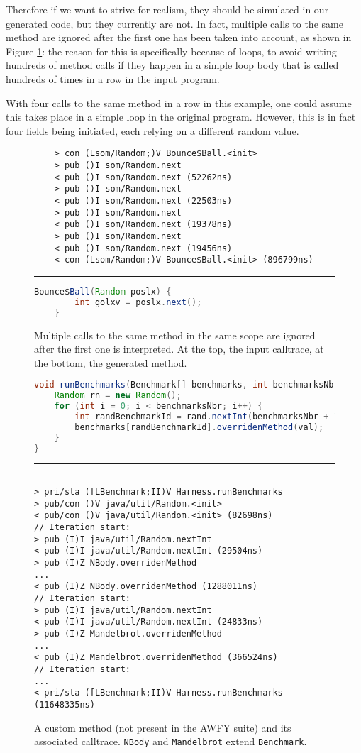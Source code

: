 \documentclass[12pt]{article}
\begin{document}
Therefore if we want to strive for realism, they should be simulated in our generated code, but they currently are not. In fact, multiple calls to the same method are ignored after the first one has been taken into account, as shown in Figure \ref{fig:multiplecalls}: the reason for this is specifically because of loops, to avoid writing hundreds of method calls if they happen in a simple loop body that is called hundreds of times in a row in the input program.

With four calls to the same method in a row in this example, one could assume this takes place in a simple loop in the original program. However, this is in fact four fields being initiated, each relying on a different random value.

\begin{figure}[h!]
\begin{verbatim}
	> con (Lsom/Random;)V Bounce$Ball.<init>
	> pub ()I som/Random.next
	< pub ()I som/Random.next (52262ns)
	> pub ()I som/Random.next
	< pub ()I som/Random.next (22503ns)
	> pub ()I som/Random.next
	< pub ()I som/Random.next (19378ns)
	> pub ()I som/Random.next
	< pub ()I som/Random.next (19456ns)
	< con (Lsom/Random;)V Bounce$Ball.<init> (896799ns)
\end{verbatim}
\hrule
\begin{lstlisting}[language=java]
	Bounce$Ball(Random poslx) {
		int golxv = poslx.next();
	}
\end{lstlisting}
\captionsetup{justification=centering}
\caption{Multiple calls to the same method in the same scope are ignored after the first one is interpreted. At the top, the input calltrace, at the bottom, the generated method.}
\label{fig:multiplecalls}
\end{figure}

\begin{figure}[h!]
\begin{lstlisting}[language=java]
void runBenchmarks(Benchmark[] benchmarks, int benchmarksNbr, int val) {
	Random rn = new Random();
	for (int i = 0; i < benchmarksNbr; i++) {
		int randBenchmarkId = rand.nextInt(benchmarksNbr + 1);
		benchmarks[randBenchmarkId].overridenMethod(val);
	}
}
\end{lstlisting}
\hrule
\smallskip
\begin{verbatim}
	
> pri/sta ([LBenchmark;II)V Harness.runBenchmarks
> pub/con ()V java/util/Random.<init>
< pub/con ()V java/util/Random.<init> (82698ns)
// Iteration start:
> pub (I)I java/util/Random.nextInt
< pub (I)I java/util/Random.nextInt (29504ns)
> pub (I)Z NBody.overridenMethod
...
< pub (I)Z NBody.overridenMethod (1288011ns)
// Iteration start:
> pub (I)I java/util/Random.nextInt
< pub (I)I java/util/Random.nextInt (24833ns)
> pub (I)Z Mandelbrot.overridenMethod
...
< pub (I)Z Mandelbrot.overridenMethod (366524ns)
// Iteration start:
...
< pri/sta ([LBenchmark;II)V Harness.runBenchmarks (11648335ns)
\end{verbatim}
\captionsetup{justification=centering}
\caption{A custom method (not present in the AWFY suite) and its associated calltrace. \texttt{NBody} and \texttt{Mandelbrot} extend \texttt{Benchmark}.}
\label{fig:fictional_loop}
\end{figure}
\end{document}
